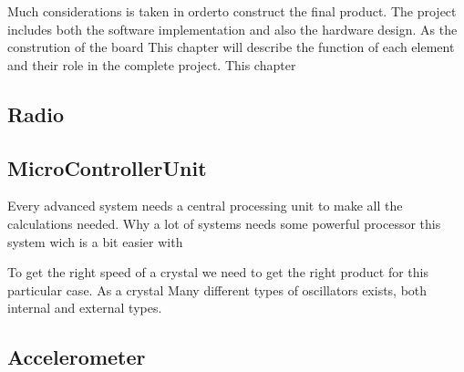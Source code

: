 Much considerations is taken in orderto construct the final product. The project includes both the software implementation and also the hardware design. As the constrution of the board 
This chapter will describe the function of each element and their role in the complete project. 
This chapter 
\subsection{Radio}

\subsection{MicroControllerUnit}
Every advanced system needs a central processing unit to make all the calculations needed. Why a lot of systems needs some powerful processor this system wich is a bit easier with 

To get the right speed of a crystal we need to get the right product for this particular case. As a crystal 
Many different types of oscillators exists, both internal and external types. 

\subsection{Accelerometer}
